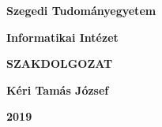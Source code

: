 \documentclass[12pt]{report}
\begin{document}
\thispagestyle{empty}

\begin{center}
{\Large\bf Szegedi Tudományegyetem}

\vspace{0.5cm}

{\Large\bf Informatikai Intézet}

\vspace*{8.5cm}


{\Huge\bf SZAKDOLGOZAT}


\vspace*{7cm}

{\LARGE\bf Kéri Tamás József}

\vspace*{0.6cm}

{\Large\bf 2019}

\end{center}
\end{document}
